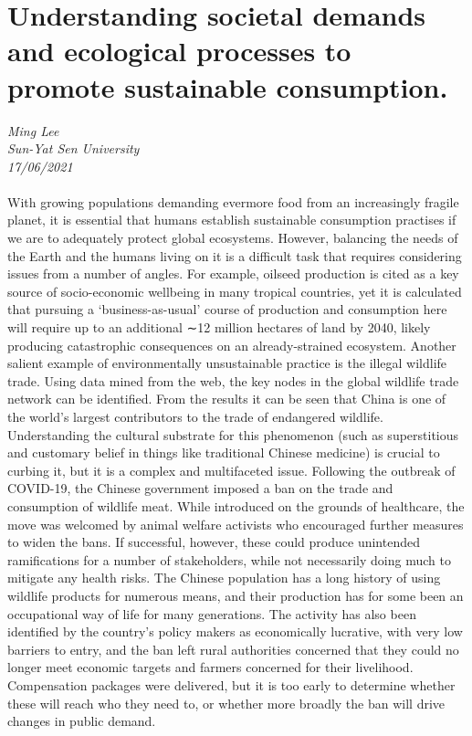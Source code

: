 \documentclass[11pt]{article}
\begin{document}
\section{Understanding societal demands and ecological processes to promote sustainable consumption.}
\textit{Ming Lee\\Sun-Yat Sen University\\17/06/2021}
\\
\\With growing populations demanding evermore food from an increasingly fragile planet, it is essential that humans establish sustainable consumption practises if we are to adequately protect global ecosystems. However, balancing the needs of the Earth and the humans living on it is a difficult task that requires considering issues from a number of angles. For example, oilseed production is cited as a key source of socio-economic wellbeing in many tropical countries, yet it is calculated that pursuing a ‘business-as-usual’ course of production and consumption here will require up to an additional ∼12 million hectares of land by 2040, likely producing catastrophic consequences on an already-strained ecosystem. Another salient example of environmentally unsustainable practice is the illegal wildlife trade. Using data mined from the web, the key nodes in the global wildlife trade network can be identified. From the results it can be seen that China is one of the world's largest contributors to the trade of endangered wildlife. Understanding the cultural substrate for this phenomenon (such as superstitious and customary belief in things like traditional Chinese medicine) is crucial to curbing it, but it is a complex and multifaceted issue. Following the outbreak of COVID-19, the Chinese government imposed a ban on the trade and consumption of wildlife meat. While introduced on the grounds of healthcare, the move was welcomed by animal welfare activists who encouraged further measures to widen the bans. If successful, however, these could produce unintended ramifications for a number of stakeholders, while not necessarily doing much to mitigate any health risks. The Chinese population has a long history of using wildlife products for numerous means, and their production has for some been an occupational way of life for many generations. The activity has also been identified by the country's policy makers as economically lucrative, with very low barriers to entry, and the ban left rural authorities concerned that they could no longer meet economic targets and farmers concerned for their livelihood. Compensation packages were delivered, but it is too early to determine whether these will reach who they need to, or whether more broadly the ban will drive changes in public demand.


\newpage

\end{document}

